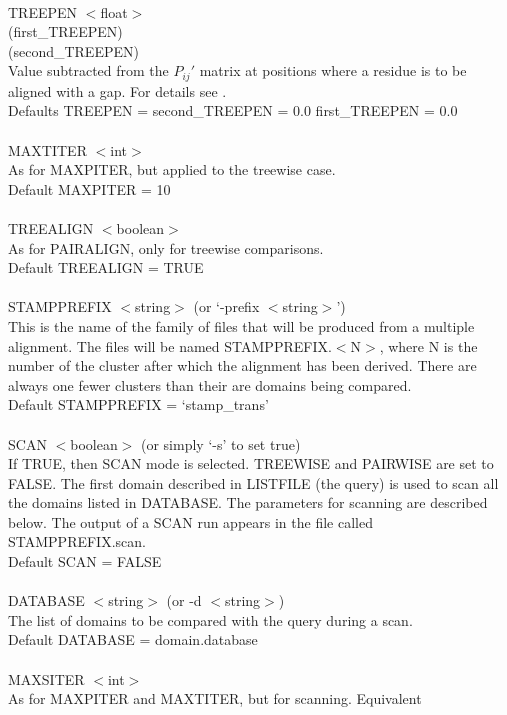 \\
TREEPEN $<$float$>$\\
(first\_TREEPEN)\\
(second\_TREEPEN)\\
Value subtracted from the $P_{ij}{\prime}$ matrix at positions where a
residue is to be aligned with a gap.  For details see \cite{rb92b}.\\
Defaults TREEPEN = second\_TREEPEN = 0.0  first\_TREEPEN = 0.0\\
\\
MAXTITER $<$int$>$\\
As for MAXPITER, but applied to the treewise case.\\
Default MAXPITER = 10\\
\\
TREEALIGN $<$boolean$>$\\
As for PAIRALIGN, only for treewise comparisons.\\
Default TREEALIGN = TRUE\\
\\
STAMPPREFIX $<$string$>$ (or `-prefix $<$string$>$')\\
This is the name of the family of files that will be produced from 
a multiple alignment.  The files will be named STAMPPREFIX.$<$N$>$, 
where N is the number of the cluster after which the alignment 
has been derived.  There are always one fewer clusters than their 
are domains being compared.\\
Default STAMPPREFIX = `stamp\_trans'\\
\\
SCAN $<$boolean$>$ (or simply `-s' to set true) \\
If TRUE, then SCAN mode is selected.  TREEWISE and PAIRWISE are set
to FALSE.  The first domain described in LISTFILE (the query) is 
used to scan all the domains listed in DATABASE.  The parameters 
for scanning are described below.  The output of a SCAN run appears
in the file called STAMPPREFIX.scan.\\
Default SCAN = FALSE\\
\\
DATABASE $<$string$>$ (or -d $<$string$>$)\\
The list of domains to be compared with the query during a scan.\\
Default DATABASE = domain.database\\
\\
MAXSITER $<$int$>$\\
As for MAXPITER and MAXTITER, but for scanning.  Equivalent
